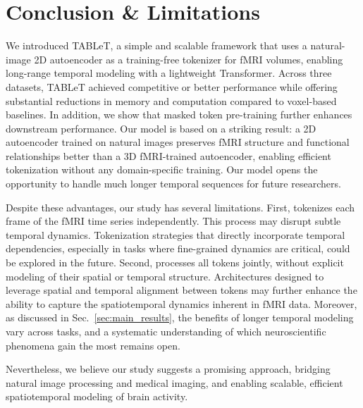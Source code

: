 \section{Conclusion \& Limitations}
We introduced TABLeT, a simple and scalable framework that uses a natural-image 2D autoencoder as a training-free tokenizer for fMRI volumes, enabling long-range temporal modeling with a lightweight Transformer. Across three datasets, TABLeT achieved competitive or better performance while offering substantial reductions in memory and computation compared to voxel-based baselines. In addition, we show that masked token pre-training further enhances downstream performance.
Our model is based on a striking result: a 2D autoencoder trained on natural images preserves fMRI structure and functional relationships better than a 3D fMRI-trained autoencoder, enabling efficient tokenization without any domain-specific training. Our model opens the opportunity to handle much longer temporal sequences for future researchers.

Despite these advantages, our study has several limitations.
First, {\ours} tokenizes each frame of the fMRI time series independently. This process may disrupt subtle temporal dynamics. Tokenization strategies that directly incorporate temporal dependencies, especially in tasks where fine-grained dynamics are critical, could be explored in the future.
Second, {\ours} processes all tokens jointly, without explicit modeling of their spatial or temporal structure. Architectures designed to leverage spatial and temporal alignment between tokens may further enhance the ability to capture the spatiotemporal dynamics inherent in fMRI data.
Moreover, as discussed in Sec.~\ref{sec:main_results}, the benefits of longer temporal modeling vary across tasks, and a systematic understanding of which neuroscientific phenomena gain the most remains open.

Nevertheless, we believe our study suggests a promising approach, bridging natural image processing and medical imaging, and enabling scalable, efficient spatiotemporal modeling of brain activity.


